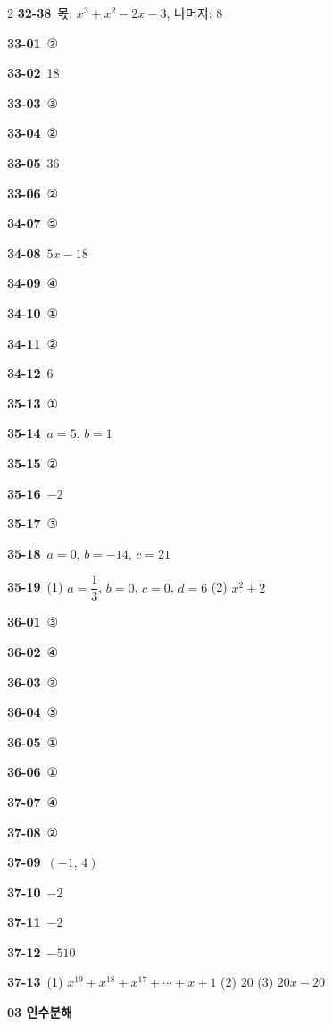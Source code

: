 \documentclass[10pt,a4paper]{article}
\begin{document}
\begin{multicols}{2}
\noindent\textbf{32-38}\ 몫: $x^3+x^2-2x-3$, 나머지: 8\par
\noindent\textbf{33-01}\ ②\par
\noindent\textbf{33-02}\ 18\par
\noindent\textbf{33-03}\ ③\par
\noindent\textbf{33-04}\ ②\par
\noindent\textbf{33-05}\ 36\par
\noindent\textbf{33-06}\ ②\par
\noindent\textbf{34-07}\ ⑤\par
\noindent\textbf{34-08}\ $5x-18$\par
\noindent\textbf{34-09}\ ④\par
\noindent\textbf{34-10}\ ①\par
\noindent\textbf{34-11}\ ②\par
\noindent\textbf{34-12}\ 6\par
\noindent\textbf{35-13}\ ①\par
\noindent\textbf{35-14}\ $a=5$, $b=1$\par
\noindent\textbf{35-15}\ ②\par
\noindent\textbf{35-16}\ $-2$\par
\noindent\textbf{35-17}\ ③\par
\noindent\textbf{35-18}\ $a=0$, $b=-14$, $c=21$\par
\noindent\textbf{35-19}\ (1) $a=\dfrac{1}{3}$, $b=0$, $c=0$, $d=6$ (2) $x^2+2$\par
\noindent\textbf{36-01}\ ③\par
\noindent\textbf{36-02}\ ④\par
\noindent\textbf{36-03}\ ②\par
\noindent\textbf{36-04}\ ③\par
\noindent\textbf{36-05}\ ①\par
\noindent\textbf{36-06}\ ①\par
\noindent\textbf{37-07}\ ④\par
\noindent\textbf{37-08}\ ②\par
\noindent\textbf{37-09}\ $(-1,\,4)$\par
\noindent\textbf{37-10}\ $-2$\par
\noindent\textbf{37-11}\ $-2$\par
\noindent\textbf{37-12}\ $-510$\par
\noindent\textbf{37-13}\ (1) $x^{19}+x^{18}+x^{17}+\cdots+x+1$ (2) 20 (3) $20x-20$\par
\noindent\textbf{03 인수분해}\par\smallskip

\end{multicols}
\end{document}
